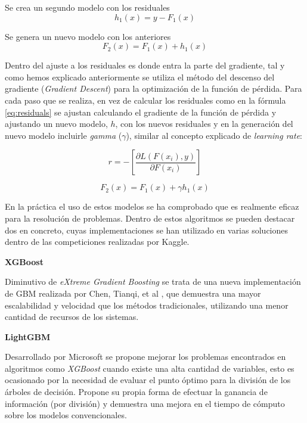 Se crea un segundo modelo con los residuales
\begin{equation}
     h_1(x) = y - F_1(x)
     \label{eq:residuals}
\end{equation}

Se genera un nuevo modelo con los anteriores
\begin{equation}
     F_2(x) = F_1(x) + h_1(x)
\end{equation}

Dentro del ajuste a los residuales es donde entra la parte del gradiente, tal y como hemos explicado anteriormente se utiliza el método del descenso del gradiente (\textit{Gradient Descent}) para la optimización de la función de pérdida. Para cada paso que se realiza, en vez de calcular los residuales como en la fórmula \ref{eq:residuals} se ajustan calculando el gradiente de la función de pérdida y ajustando un nuevo modelo, \(h\), con los nuevos residuales y en la generación del nuevo modelo incluirle \textit{gamma} (\(\gamma\)), similar al concepto explicado de \textit{learning rate}:

\begin{equation}
    r = - [ \frac{\partial L(F(x_i),y)}{\partial F(x_i)} ]
\end{equation}

\begin{equation}
        F_2(x) = F_1(x) + \gamma h_1(x)
\end{equation}

En la práctica el uso de estos modelos se ha comprobado que es realmente eficaz para la resolución de problemas. Dentro de estos algoritmos se pueden destacar dos en concreto, cuyas implementaciones se han utilizado en varias soluciones dentro de las competiciones realizadas por Kaggle.

\textbf{XGBoost}

Diminutivo de \textit{eXtreme Gradient Boosting} se trata de una nueva implementación de GBM realizada por Chen, Tianqi, et al \cite{chen2016xgboost}, que demuestra una mayor escalabilidad y velocidad que los métodos tradicionales, utilizando una menor cantidad de recursos de los sistemas.  

\textbf{LightGBM}

Desarrollado por Microsoft \cite{ke2017lightgbm} se propone mejorar los problemas encontrados en algoritmos como \textit{XGBoost} cuando existe una alta cantidad de variables, esto es ocasionado por la necesidad de evaluar el punto óptimo para la división de los árboles de decisión. Propone su propia forma de efectuar la ganancia de información (por división) y demuestra una mejora en el tiempo de cómputo sobre los modelos convencionales.

